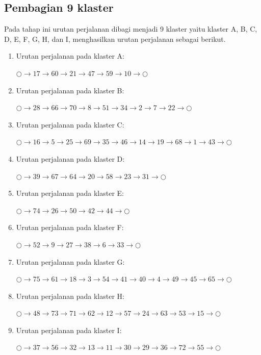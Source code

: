 \subsection{Pembagian 9 klaster}

Pada tahap ini urutan perjalanan dibagi menjadi 9 klaster yaitu klaster A, B, C, D, E, F, G, H, dan I, menghasilkan urutan perjalanan sebagai berikut.

\begin{enumerate}
\item Urutan perjalanan pada klaster A:

$\bigcirc \to 17 \to 60 \to 21 \to 47 \to 59 \to 10 \to \bigcirc$

\item Urutan perjalanan pada klaster B:

$\bigcirc \to 28 \to 66 \to 70 \to 8 \to 51 \to 34 \to 2 \to 7 \to 22 \to \bigcirc$

\item Urutan perjalanan pada klaster C:

$\bigcirc \to 16 \to 5 \to 25 \to 69 \to 35 \to 46 \to 14 \to 19 \to 68 \to 1 \to 43 \to \bigcirc$

\item Urutan perjalanan pada klaster D:

$\bigcirc \to 39 \to 67 \to 64 \to 20 \to 58 \to 23 \to 31 \to \bigcirc$

\item Urutan perjalanan pada klaster E:

$\bigcirc \to 74 \to 26 \to 50 \to 42 \to 44 \to \bigcirc$

\item Urutan perjalanan pada klaster F:

$\bigcirc \to 52 \to 9 \to 27 \to 38 \to 6 \to 33 \to \bigcirc$

\item Urutan perjalanan pada klaster G:

$\bigcirc \to 75 \to 61 \to 18 \to 3 \to 54 \to 41 \to 40 \to 4 \to 49 \to 45 \to 65 \to \bigcirc$

\item Urutan perjalanan pada klaster H:

$\bigcirc \to 48 \to 73 \to 71 \to 62 \to 12 \to 57 \to 24 \to 63 \to 53 \to 15 \to \bigcirc$

\item Urutan perjalanan pada klaster I:

$\bigcirc \to 37 \to 56 \to 32 \to 13 \to 11 \to 30 \to 29 \to 36 \to 72 \to 55 \to \bigcirc$

\end{enumerate}

